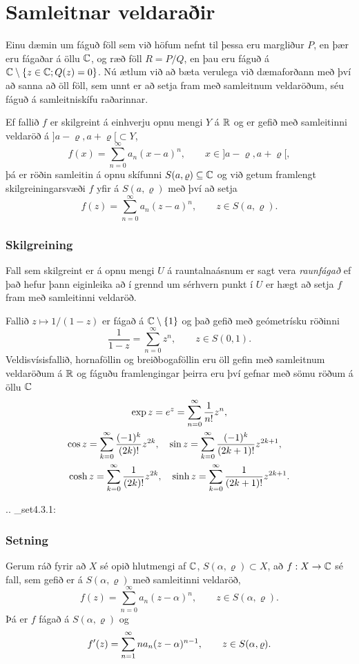 \section{Samleitnar veldaraðir} 

\noindent
Einu dæmin um fáguð föll sem við höfum nefnt til þessa eru margliður
$P$, en þær eru fágaðar á öllu ${\mathbb C}$, og ræð föll $R=P/Q$, en þau eru
fáguð á ${\mathbb C}\setminus\{z\in {\mathbb C}; Q(z)=0\}$.  Nú ætlum við að bæta
verulega við dæmaforðann með því að sanna að öll föll, sem unnt er að
setja fram með samleitnum veldaröðum, séu fáguð á samleitniskífu
raðarinnar. 


Ef fallið $f$ er skilgreint á einhverju opnu mengi $Y$ á ${\mathbb R}$ og er
gefið með samleitinni veldaröð á $]a-{\varrho},a+{\varrho}[\subset Y$,
$$
f(x)=\sum\limits_{n=0}^{\infty} a_n(x-a)^n, \qquad 
x\in  ]a-{\varrho},a+{\varrho}[,
$$
þá er röðin samleitin á opnu skífunni $S(a,{\varrho})\subseteq {\mathbb C}$ og við getum 
framlengt skilgreiningarsvæði $f$ yfir á $S(a,{\varrho})$ með því að setja
$$
f(z)=\sum\limits_{n=0}^{\infty} a_n(z-a)^n, \qquad 
z\in  S(a,{\varrho}).
$$

\subsubsection{Skilgreining}  Fall sem skilgreint er á opnu mengi $U$ á rauntalnaásnum
er sagt vera {\it raunfágað } ef það  hefur þann eiginleika að  
í grennd um sérhvern punkt í $U$ er hægt að setja $f$ fram með
samleitinni  veldaröð.


Fallið $z\mapsto 1/(1-z)$ er fágað á ${\mathbb C}\setminus\{1\}$ og það 
gefið með geómetrísku röðinni
$$
\dfrac 1{1-z}=\sum_{n=0}^\infty z^n, \qquad z\in S(0,1). 
$$
Veldisvísisfallið, hornaföllin og breiðbogaföllin eru öll gefin með
samleitnum veldaröðum á ${\mathbb R}$ og fáguðu framlengingar þeirra eru því 
gefnar með sömu röðum á öllu ${\mathbb C}$
\begin{gather*}
\exp z =e\sp z = \sum_{n=0}^\infty \dfrac 1{n!}z^n, \\
\cos z = \sum_{k=0}\sp \infty \dfrac {(-1)\sp k}{(2k)!}z\sp{2k}, \quad
\sin z = \sum_{k=0}\sp \infty \dfrac {(-1)\sp k}{(2k+1)!}z\sp{2k+1},
\quad\\
\cosh z = \sum_{k=0}\sp \infty \dfrac {1}{(2k)!}z\sp{2k}, \quad
\sinh z = \sum_{k=0}\sp \infty \dfrac {1}{(2k+1)!}z\sp{2k+1}.
\end{gather*}



.. _set4.3.1:

\subsubsection{Setning} Gerum ráð fyrir að $X$ sé opið hlutmengi af ${\mathbb C}$, 
$S(\alpha,\varrho)\subset X$, að $f:X\to {\mathbb C}$
sé fall, sem  gefið er á $S(\alpha,\varrho)$ með samleitinni veldaröð,
 $$f(z)=\sum_{n=0}^\infty a_n(z-\alpha)^n, \qquad z\in S(\alpha,\varrho).
 $$
Þá er $f$ fágað á $S(\alpha,\varrho)$ og
 $$f{\sp{\prime}}(z)=\sum_{n=1}^\infty na_n(z-\alpha)^{n-1}, \qquad z\in
S(\alpha,\varrho). 
 $$


